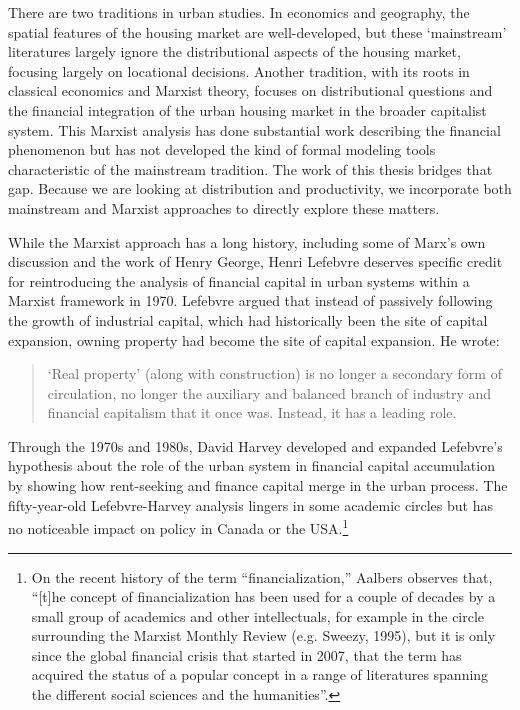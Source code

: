 There are two traditions in urban studies. In economics and geography, the spatial features of the housing market are well-developed, but these `mainstream' literatures largely ignore the distributional aspects of the housing market, focusing largely on locational decisions. Another tradition, with its roots in \Gls{classical economics} and Marxist theory, focuses on distributional questions and the financial integration of the urban housing market in the broader capitalist system.  This Marxist analysis has done substantial work describing the financial phenomenon but has not developed the kind of formal modeling tools characteristic of the mainstream tradition.   The work of this thesis bridges that gap. Because we are looking at distribution and productivity, we incorporate both mainstream and Marxist approaches to directly explore these matters.


While the Marxist approach has a long history, including some of Marx's own discussion and the work of Henry George,  Henri Lefebvre%
\cite{lefebvreRevolutionUrbaine1970, lefebvreUrbanRevolution2003}  deserves specific credit for  reintroducing the analysis of financial capital in urban systems within a Marxist framework in 1970. Lefebvre argued that instead of passively following the growth of industrial capital, which had historically been the site of capital expansion,  owning property had become the site of capital expansion.  He wrote:
\begin{quotation}
\noindent ‘Real property’ (along with construction) is no longer a secondary form of circulation, no longer the auxiliary and balanced branch of industry and financial capitalism that it once was. Instead, it has a leading role. 
\end{quotation}

Through the 1970s and 1980s, David Harvey \cite{harveyClassmonopolyRentFinance1974} developed and expanded Lefebvre’s hypothesis about the role of the urban system in financial capital accumulation by showing how rent-seeking and finance capital merge in the urban process. The fifty-year-old Lefebvre-Harvey analysis lingers in some academic circles but has no noticeable impact on policy in Canada or the USA.\footnote{On the recent history of the term ``financialization,'' Aalbers observes that, ``[t]he concept of financialization has been used for a couple of decades by a small group of academics and other intellectuals, for example in the circle surrounding the Marxist Monthly Review (e.g. Sweezy, 1995), but it is only since the global financial crisis that started in 2007, that the term has acquired the status of a popular concept in a range of literatures spanning the different social sciences and the humanities''\cite{aalbersVariegatedFinancializationHousing2017}.}  


